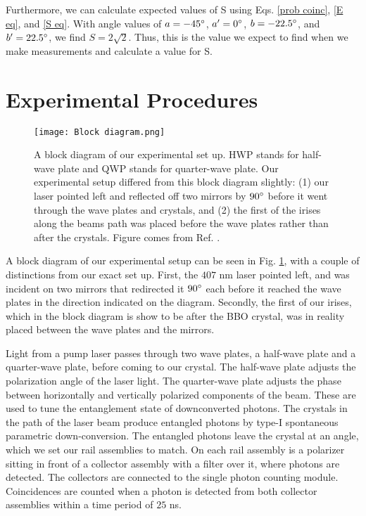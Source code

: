 \documentclass[11pt,letterpaper]{article}
\begin{document}
Furthermore, we can calculate expected values of S using Eqs. \ref{prob coinc}, \ref{E eq}, and \ref{S eq}. With angle values of $a = -45\degree$, $a' = 0\degree$, $b = -22.5\degree$, and $b' = 22.5\degree$, we find $S = 2\sqrt{2}$. Thus, this is the value we expect to find when we make measurements and calculate a value for S.



\section{Experimental Procedures}

\begin{figure}
\centerline{\texttt{[image: Block diagram.png]}}
\caption{A block diagram of our experimental set up. HWP stands for half-wave plate and QWP stands for quarter-wave plate. Our experimental setup differed from this block diagram slightly: (1) our laser pointed left and reflected off two mirrors by $90\degree$ before it went through the wave plates and crystals, and (2) the first of the irises along the beams path was placed before the wave plates rather than after the crystals. Figure comes from Ref. \cite{Lab manual}.} \label{Block diagram}
\end{figure}

A block diagram of our experimental setup can be seen in Fig. \ref{Block diagram}, with a couple of distinctions from our exact set up. First, the $407$ nm laser pointed left, and was incident on two mirrors that redirected it $90\degree$ each before it reached the wave plates in the direction indicated on the diagram. Secondly, the first of our irises, which in the block diagram is show to be after the BBO crystal, was in reality placed between the wave plates and the mirrors. 

Light from a pump laser passes through two wave plates, a half-wave plate and a quarter-wave plate, before coming to our crystal. The half-wave plate adjusts the polarization angle of the laser light. The quarter-wave plate adjusts the phase between horizontally and vertically polarized components of the beam. These are used to tune the entanglement state of downconverted photons. The crystals in the path of the laser beam produce entangled photons by type-I spontaneous parametric down-conversion. The entangled photons leave the crystal at an angle, which we set our rail assemblies to match. On each rail assembly is a polarizer sitting in front of a collector assembly with a filter over it, where photons are detected. The collectors are connected to the single photon counting module. Coincidences are counted when a photon is detected from both collector assemblies within a time period of $25$ ns.
\end{document}
